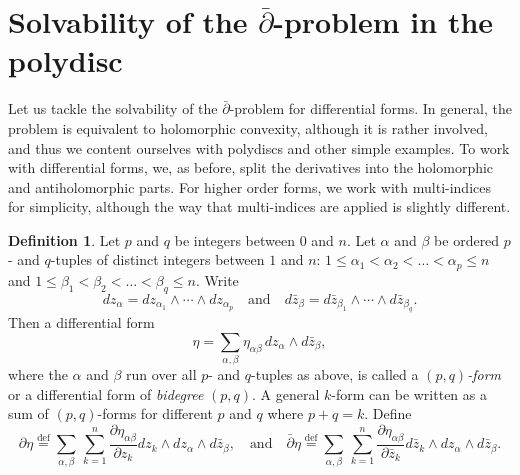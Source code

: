 \documentclass[12pt,openany]{book}
\newcommand{\myindex}[1]{#1\index{#1}}
\theoremstyle{plain}
\theoremstyle{remark}
\theoremstyle{definition}
\newtheorem{defn}[thm]{Definition}
\theoremstyle{exercise}
\theoremstyle{example}
\begin{document}

\section{Solvability of the \texorpdfstring{$\bar{\partial}$}{dbar}-problem in the polydisc} \label{sec:dbarpoly}

Let us tackle the solvability of the $\bar{\partial}$-problem for differential forms.
In general, the problem is equivalent to holomorphic convexity, although
it is rather involved, and thus we content ourselves with polydiscs and
other simple examples.
To work with differential forms, we, as before, split the derivatives
into the holomorphic and antiholomorphic parts.  For higher order forms,
we work with multi-indices for simplicity, although the way that
multi-indices are applied is slightly different.

\begin{defn} \label{defn:danddbarform}
\pagebreak[2]
Let $p$ and $q$ be integers between $0$ and $n$.
Let $\alpha$ and $\beta$ be ordered $p$- and $q$-tuples of
distinct integers between $1$ and $n$:
$1 \leq \alpha_1 < \alpha_2 < \dots < \alpha_p \leq n$ and
$1 \leq \beta_1 < \beta_2 < \dots < \beta_q \leq n$.
Write
\begin{equation*}
dz_{\alpha} =
dz_{\alpha_1}
\wedge
\cdots
\wedge
dz_{\alpha_p}
\quad
\text{and}
\quad
d\bar{z}_{\beta} =
d\bar{z}_{\beta_1}
\wedge
\cdots
\wedge
d\bar{z}_{\beta_q} .
\end{equation*}
Then a differential form
\begin{equation*}
\eta =
\sum_{\alpha,\beta}
\eta_{\alpha \beta} \, dz_\alpha \wedge d\bar{z}_\beta ,
\end{equation*}
where the $\alpha$ and $\beta$ run over all $p$- and $q$-tuples
as above,
is called a
\emph{\myindex{$(p,q)$-form}} or a differential form of
\emph{\myindex{bidegree}} $(p,q)$.
A general $k$-form can be written as a sum of $(p,q)$-forms
for different $p$ and $q$ where $p+q = k$.
Define
%
%
\begin{equation*}
\partial \eta \overset{\text{def}}{=}
\sum_{\alpha,\beta}
\,
\sum_{k=1}^n
\frac{\partial \eta_{\alpha \beta}}{\partial z_k} dz_k \wedge dz_\alpha
\wedge d\bar{z}_\beta ,
\quad \text{and} \quad
\bar{\partial} \eta \overset{\text{def}}{=}
\sum_{\alpha,\beta}
\,
\sum_{k=1}^n
\frac{\partial \eta_{\alpha \beta}}{\partial \bar{z}_k} d\bar{z}_k \wedge dz_\alpha
\wedge d\bar{z}_\beta .
\end{equation*}
\end{defn}
\end{document}
